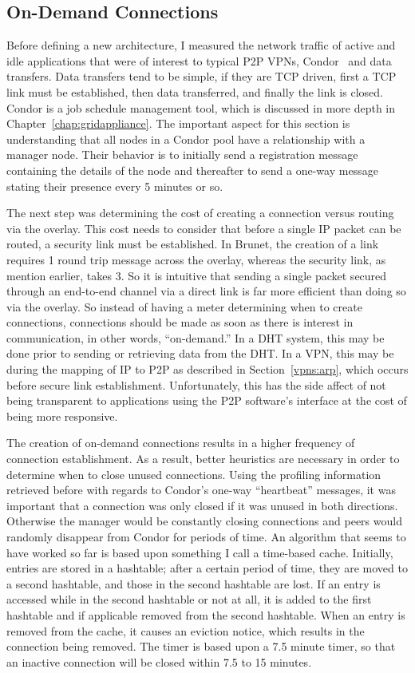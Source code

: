 \subsection{On-Demand Connections}

Before defining a new architecture, I measured the network traffic of active
and idle applications that were of interest to typical P2P VPNs,
Condor~\cite{condor0} and data transfers.  Data transfers tend to be simple, if
they are TCP driven, first a TCP link must be established, then data
transferred, and finally the link is closed.  Condor is a job schedule
management tool, which is discussed in more depth in
Chapter~\ref{chap:gridappliance}.  The important aspect for this section is
understanding that all nodes in a Condor pool have a relationship with a
manager node.  Their behavior is to initially send a registration message
containing the details of the node and thereafter to send a one-way message
stating their presence every 5 minutes or so.

The next step was determining the cost of creating a connection versus routing
via the overlay.  This cost needs to consider that before a single IP packet
can be routed, a security link must be established.  In Brunet, the creation of
a link requires 1 round trip message across the overlay, whereas the security
link, as mention earlier, takes 3.  So it is intuitive that sending a single
packet secured through an end-to-end channel via a direct link is far more
efficient than doing so via the overlay.  So instead of having a meter
determining when to create connections, connections should be made as soon as
there is interest in communication, in other words, ``on-demand.''  In a DHT
system, this may be done prior to sending or retrieving data from the DHT.  In
a VPN, this may be during the mapping of IP to P2P as described in
Section~\ref{vpns:arp}, which occurs before secure link establishment.
Unfortunately, this has the side affect of not being transparent to
applications using the P2P software's interface at the cost of being more
responsive.

The creation of on-demand connections results in a higher frequency of
connection establishment.  As a result, better heuristics are necessary in
order to determine when to close unused connections.  Using the profiling
information retrieved before with regards to Condor's one-way ``heartbeat''
messages, it was important that a connection was only closed if it was unused
in both directions.  Otherwise the manager would be constantly closing
connections and peers would randomly disappear from Condor for periods of time.
An algorithm that seems to have worked so far is based upon something I call a
time-based cache.  Initially, entries are stored in a hashtable; after a
certain period of time, they are moved to a second hashtable, and those in the
second hashtable are lost.  If an entry is accessed while in the second
hashtable or not at all, it is added to the first hashtable and if applicable
removed from the second hashtable.  When an entry is removed from the cache, it
causes an eviction notice, which results in the connection being removed.  The
timer is based upon a 7.5 minute timer, so that an inactive connection will be
closed within 7.5 to 15 minutes.

